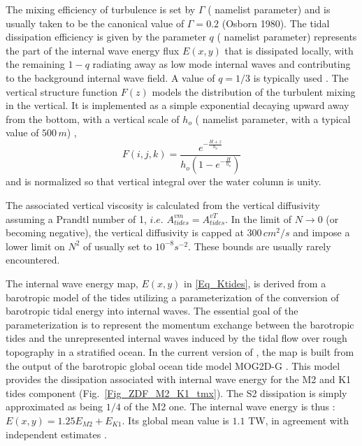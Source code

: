 {The mixing efficiency of turbulence is set by $\Gamma$ ( namelist parameter)
and is usually taken to be the canonical value of $\Gamma = 0.2$ (Osborn 1980). 
The tidal dissipation efficiency is given by the parameter $q$ ( namelist parameter) 
represents the part of the internal wave energy flux $E(x, y)$ that is dissipated locally, 
with the remaining $1-q$ radiating away as low mode internal waves and 
contributing to the background internal wave field. A value of $q=1/3$ is typically used  
\citet{St_Laurent_al_GRL02}.
The vertical structure function $F(z)$ models the distribution of the turbulent mixing in the vertical. 
It is implemented as a simple exponential decaying upward away from the bottom, 
with a vertical scale of $h_o$ ( namelist parameter, with a typical value of $500\,m$) \citep{St_Laurent_Nash_DSR04}, 
\begin{equation} \label{Eq_Fz}
F(i,j,k) = \frac{ e^{ -\frac{H+z}{h_o} } }{ h_o \left( 1- e^{ -\frac{H}{h_o} } \right) }
\end{equation}
and is normalized so that vertical integral over the water column is unity. 

The associated vertical viscosity is calculated from the vertical 
diffusivity assuming a Prandtl number of 1, $i.e.$ $A^{vm}_{tides}=A^{vT}_{tides}$. 
In the limit of $N \rightarrow 0$ (or becoming negative), the vertical diffusivity 
is capped at $300\,cm^2/s$ and impose a lower limit on $N^2$ of  
usually set to $10^{-8} s^{-2}$. These bounds are usually rarely encountered.

The internal wave energy map, $E(x, y)$ in \eqref{Eq_Ktides}, is derived 
from a barotropic model of the tides utilizing a parameterization of the 
conversion of barotropic tidal energy into internal waves. 
The essential goal of the parameterization is to represent the momentum 
exchange between the barotropic tides and the unrepresented internal waves 
induced by the tidal flow over rough topography in a stratified ocean. 
In the current version of \NEMO, the map is built from the output of 
the barotropic global ocean tide model MOG2D-G \citep{Carrere_Lyard_GRL03}.
This model provides the dissipation associated with internal wave energy for the M2 and K1 
tides component (Fig.~\ref{Fig_ZDF_M2_K1_tmx}). The S2 dissipation is simply approximated
as being $1/4$ of the M2 one. The internal wave energy is thus : $E(x, y) = 1.25 E_{M2} + E_{K1}$. 
Its global mean value is $1.1$ TW, in agreement with independent estimates 
\citep{Egbert_Ray_Nat00, Egbert_Ray_JGR01}. 

}

